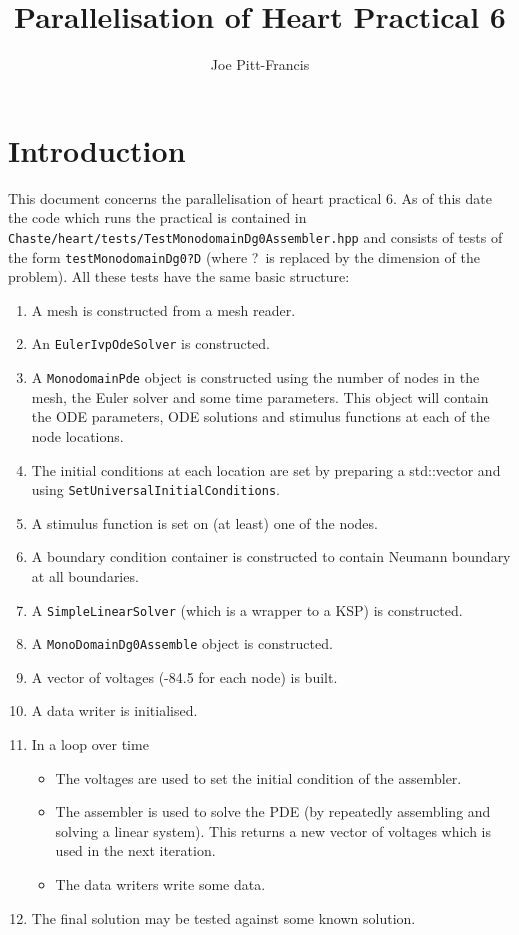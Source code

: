 \documentclass{article}
\author{Joe Pitt-Francis}
\title{Parallelisation of Heart Practical 6}
\begin{document}
\maketitle
\section{Introduction}

This document concerns the parallelisation of heart practical 6.  As of
this date the code which runs the practical is contained in {\tt
Chaste/heart/tests/TestMonodomainDg0Assembler.hpp} and consists of tests
of the form {\tt testMonodomainDg0?D} (where ?\ is replaced by the
dimension of the problem).  All these tests have the same basic
structure:
\begin{enumerate}
\item
A mesh is constructed from a mesh reader.
\item 
An {\tt EulerIvpOdeSolver} is constructed.
\item 
A {\tt MonodomainPde} object is constructed using the number of
nodes in the mesh, the Euler solver and some time parameters.  This
object will contain the ODE parameters, ODE solutions and stimulus
functions at each of the node locations.
\item
The initial conditions at each location are set by preparing a std::vector
and using {\tt SetUniversalInitialConditions}.
\item
A stimulus function is set on (at least) one of the nodes.
\item
A boundary condition container is constructed to contain Neumann
boundary at all boundaries.
\item
A {\tt SimpleLinearSolver} (which is a wrapper to a KSP) is
constructed.
\item A {\tt MonoDomainDg0Assemble} object is constructed.
\item A vector of voltages (-84.5  for each node) is built.
\item A data writer is initialised.
\item In a loop over time
\begin{itemize}
\item The voltages are used to set the initial condition of the
assembler.
\item The assembler is used to solve the PDE (by repeatedly assembling
and solving a linear system). This returns a new vector of voltages
which is used in the next iteration.
\item The data writers write some data.
\end{itemize}
\item The final solution may be tested against some known solution.
\end{enumerate}
\end{document}
